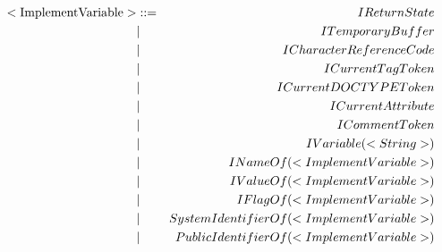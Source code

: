 \documentclass[uplatex,a4j]{jsreport}
\begin{document}
\begin{eqnarray*}
    {\rm <ImplementVariable> }&::=& IReturnState\\
      &|& ITemporaryBuffer \\
      &|& ICharacterReferenceCode \\
      &|& ICurrentTagToken \\
      &|& ICurrentDOCTYPEToken \\
      &|& ICurrentAttribute \\
      &|& ICommentToken \\
      &|& IVariable(<String>) \\
      &|& INameOf(<ImplementVariable>) \\
      &|& IValueOf(<ImplementVariable>) \\
      &|& IFlagOf(<ImplementVariable>) \\
      &|& SystemIdentifierOf(<ImplementVariable>) \\
      &|& PublicIdentifierOf(<ImplementVariable>) \\
\end{eqnarray*}
\end{document}
